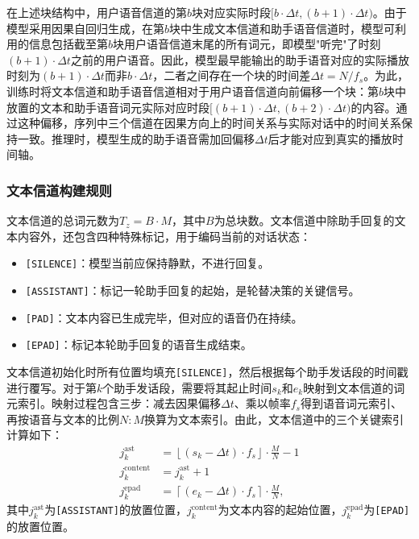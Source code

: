在上述块结构中，用户语音信道的第$b$块对应实际时段$[b \cdot \Delta t, (b+1) \cdot \Delta t)$。由于模型采用因果自回归生成，在第$b$块中生成文本信道和助手语音信道时，模型可利用的信息包括截至第$b$块用户语音信道末尾的所有词元，即模型"听完"了时刻$(b+1) \cdot \Delta t$之前的用户语音。因此，模型最早能输出的助手语音对应的实际播放时刻为$(b+1) \cdot \Delta t$而非$b \cdot \Delta t$，二者之间存在一个块的时间差$\Delta t = N / f_s$。为此，训练时将文本信道和助手语音信道相对于用户语音信道向前偏移一个块：第$b$块中放置的文本和助手语音词元实际对应时段$[(b+1) \cdot \Delta t, (b+2) \cdot \Delta t)$的内容。通过这种偏移，序列中三个信道在因果方向上的时间关系与实际对话中的时间关系保持一致。推理时，模型生成的助手语音需加回偏移$\Delta t$后才能对应到真实的播放时间轴。

\subsubsection{文本信道构建规则}

文本信道的总词元数为$T_z = B \cdot M$，其中$B$为总块数。文本信道中除助手回复的文本内容外，还包含四种特殊标记，用于编码当前的对话状态：
\begin{itemize}
    \item \texttt{[SILENCE]}：模型当前应保持静默，不进行回复。
    \item \texttt{[ASSISTANT]}：标记一轮助手回复的起始，是轮替决策的关键信号。
    \item \texttt{[PAD]}：文本内容已生成完毕，但对应的语音仍在持续。
    \item \texttt{[EPAD]}：标记本轮助手回复的语音生成结束。
\end{itemize}

文本信道初始化时所有位置均填充\texttt{[SILENCE]}，然后根据每个助手发话段的时间戳进行覆写。对于第$k$个助手发话段，需要将其起止时间$s_k$和$e_k$映射到文本信道的词元索引。映射过程包含三步：减去因果偏移$\Delta t$、乘以帧率$f_s$得到语音词元索引、再按语音与文本的比例$N:M$换算为文本索引。由此，文本信道中的三个关键索引计算如下：
\begin{align}
    j_k^{\text{ast}} &= \left\lfloor (s_k - \Delta t) \cdot f_s \right\rfloor \cdot \frac{M}{N} - 1 \\
    j_k^{\text{content}} &= j_k^{\text{ast}} + 1 \\
    j_k^{\text{epad}} &= \left\lceil (e_k - \Delta t) \cdot f_s \right\rceil \cdot \frac{M}{N},
\end{align}
其中$j_k^{\text{ast}}$为\texttt{[ASSISTANT]}的放置位置，$j_k^{\text{content}}$为文本内容的起始位置，$j_k^{\text{epad}}$为\texttt{[EPAD]}的放置位置。

